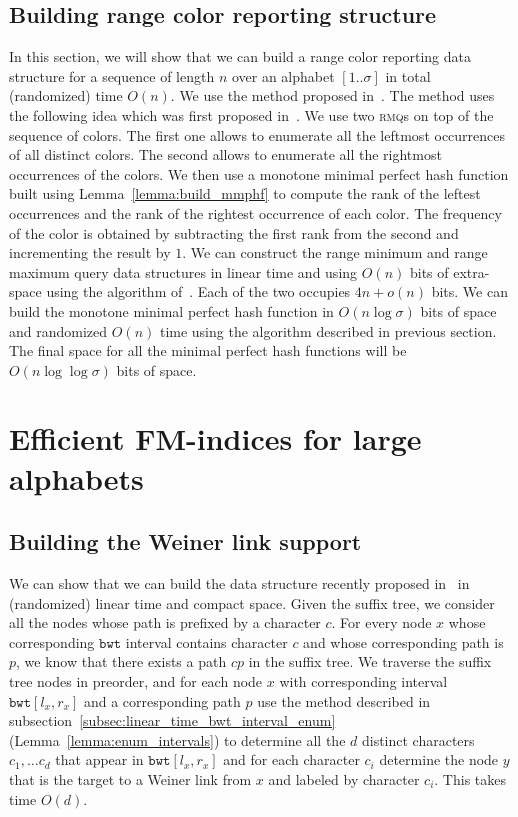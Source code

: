 \documentclass[a4paper]{article}
\begin{document}
\subsection{Building range color reporting structure}
\label{sec:build_range_color_rep}
In this section, we will show that we can build a range color reporting data structure for 
a sequence of length $n$ over an alphabet $[1..\sigma]$ in total (randomized) time $O(n)$. 
We use the method proposed in~\cite{BNV13}. The method uses the following idea which was first proposed
in~\cite{Sa07b}. We use two \textsc{rmq}s on top of the sequence of colors. The first one 
allows to enumerate all the leftmost occurrences of all distinct colors. The second allows to enumerate
all the rightmost occurrences of the colors. We then use a monotone minimal perfect hash function built 
using Lemma~\ref{lemma:build_mmphf} to compute the rank of the leftest occurrences and the rank of the rightest occurrence of each color. 
The frequency of the color is obtained by subtracting the first rank from the second and incrementing 
the result by $1$. 
We can construct the range minimum and range maximum query data structures in linear time 
and using $O(n)$ bits of extra-space using the algorithm 
of~\cite{Fi10}. Each of the two occupies $4n+o(n)$ bits. We can build the monotone minimal 
perfect hash function in $O(n\log\sigma)$ bits of space and randomized $O(n)$ time using 
the algorithm described in previous section. 
The final space for all the minimal perfect hash functions will be $O(n\log\log\sigma)$ bits
of space. 

\section{Efficient FM-indices for large alphabets}
\label{sec:build_ext_fm_indices}

\subsection{Building the Weiner link support}
\label{sec:build_weiner_links}
We can show that we can build the data structure recently proposed in~\cite{BNtalg14} in 
(randomized) linear time and compact space. 
Given the suffix tree, we consider all the nodes whose path is prefixed by 
a character $c$. For every node $x$ whose corresponding $\mathtt{bwt}$ 
interval contains character $c$ and whose corresponding path is $p$, we know that there 
exists a path $cp$ in the suffix tree. 
We traverse the suffix tree nodes in preorder, and for each node $x$ with corresponding 
interval $\mathtt{bwt}[l_x,r_x]$ and a corresponding path $p$ use the method described 
in subsection~\ref{subsec:linear_time_bwt_interval_enum}  (Lemma~\ref{lemma:enum_intervals})
to determine all the $d$ distinct characters $c_1,\ldots c_d$
that appear in $\mathtt{bwt}[l_x,r_x]$ and for each character $c_i$ 
determine the node $y$ that is the target to a Weiner link from $x$ and labeled
by character $c_i$. This takes time $O(d)$. 
\end{document}

